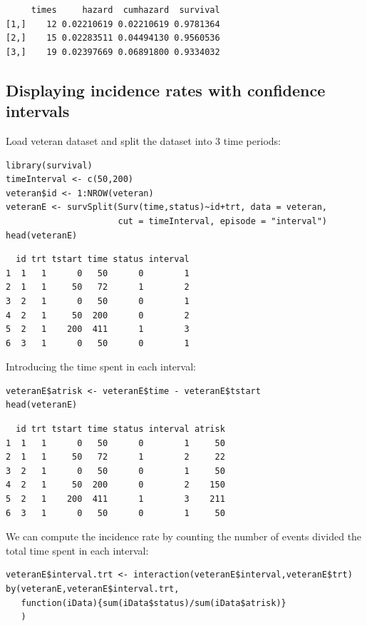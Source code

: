 \documentclass{article}
\begin{document}
\begin{verbatim}
     times     hazard  cumhazard  survival
[1,]    12 0.02210619 0.02210619 0.9781364
[2,]    15 0.02283511 0.04494130 0.9560536
[3,]    19 0.02397669 0.06891800 0.9334032
\end{verbatim}

\subsection{Displaying incidence rates with confidence intervals}
\label{sec:org369b1c8}

Load veteran dataset and split the dataset into 3 time periods:
\lstset{language=r,label= ,caption= ,captionpos=b,numbers=none}
\begin{lstlisting}
library(survival) 
timeInterval <- c(50,200)
veteran$id <- 1:NROW(veteran)
veteranE <- survSplit(Surv(time,status)~id+trt, data = veteran,
                      cut = timeInterval, episode = "interval")
head(veteranE)
\end{lstlisting}

\begin{verbatim}
  id trt tstart time status interval
1  1   1      0   50      0        1
2  1   1     50   72      1        2
3  2   1      0   50      0        1
4  2   1     50  200      0        2
5  2   1    200  411      1        3
6  3   1      0   50      0        1
\end{verbatim}


Introducing the time spent in each interval:
\lstset{language=r,label= ,caption= ,captionpos=b,numbers=none}
\begin{lstlisting}
veteranE$atrisk <- veteranE$time - veteranE$tstart
head(veteranE)
\end{lstlisting}

\begin{verbatim}
  id trt tstart time status interval atrisk
1  1   1      0   50      0        1     50
2  1   1     50   72      1        2     22
3  2   1      0   50      0        1     50
4  2   1     50  200      0        2    150
5  2   1    200  411      1        3    211
6  3   1      0   50      0        1     50
\end{verbatim}


We can compute the incidence rate by counting the number of events
divided the total time spent in each interval:
\lstset{language=r,label= ,caption= ,captionpos=b,numbers=none}
\begin{lstlisting}
veteranE$interval.trt <- interaction(veteranE$interval,veteranE$trt)
by(veteranE,veteranE$interval.trt,
   function(iData){sum(iData$status)/sum(iData$atrisk)}
   )
\end{lstlisting}
\end{document}
